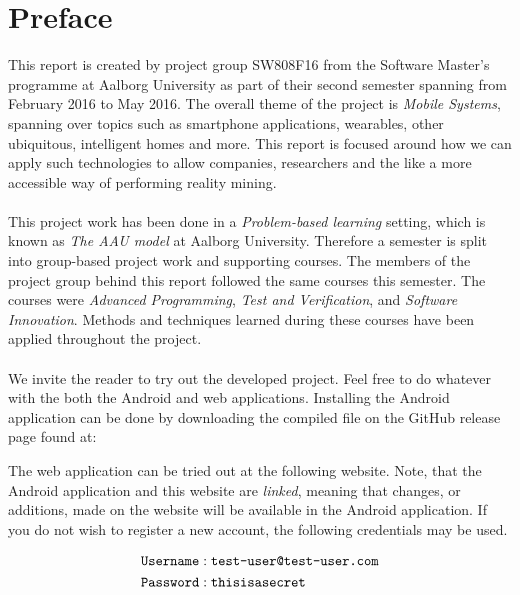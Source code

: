 
\chapter*{Preface}
This report is created by project group SW808F16 from the Software Master's programme at Aalborg University as part of their second semester spanning from February 2016 to May 2016. The overall theme of the project is \emph{Mobile Systems}, spanning over topics such as smartphone applications, wearables, other ubiquitous, intelligent homes and more. This report is focused around how we can apply such technologies to allow companies, researchers and the like a more accessible way of performing reality mining. 
\\\\
This project work has been done in a \emph{Problem-based learning} setting, which is known as \emph{The AAU model} at Aalborg University. Therefore a semester is split into group-based project work and supporting courses. The members of the project group behind this report followed the same courses this semester. The courses were \emph{Advanced Programming}, \emph{Test and Verification}, and \emph{Software Innovation}. Methods and techniques learned during these courses have been applied throughout the project.
\\\\
We invite the reader to try out the developed project. Feel free to do whatever with the both the Android and web applications. Installing the Android application can be done by downloading the compiled  file on the GitHub release page found at:

\begin{center}
\end{center}

The web application can be tried out at the following website. Note, that the Android application and this website are \emph{linked}, meaning that changes, or additions, made on the website will be available in the Android application. If you do not wish to register a new account, the following credentials may be used.

\begin{center}
\end{center} 

\vspace{-2em}

\begin{align*} 
\text{\texttt{Username}} &: \text{\texttt{test-user@test-user.com}} \\ 
\text{\texttt{Password}} &: \text{\texttt{thisisasecret}}
\end{align*}





